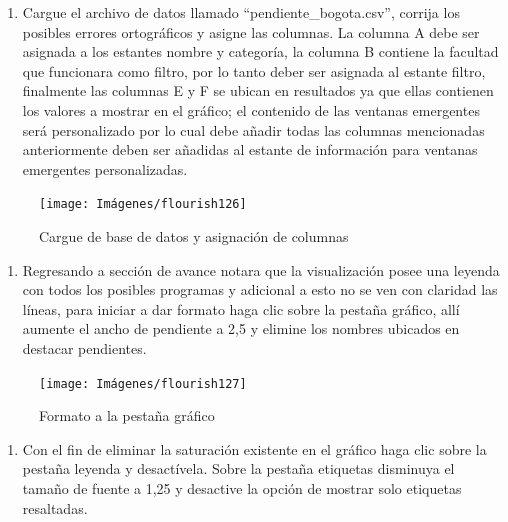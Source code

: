 \documentclass[
]{book}
\providecommand{\tightlist}{%
  \setlength{\itemsep}{0pt}\setlength{\parskip}{0pt}}
\begin{document}
\begin{enumerate}
\def\labelenumi{\arabic{enumi}.}
\tightlist
\item
  Cargue el archivo de datos llamado ``pendiente\_bogota.csv'', corrija los posibles errores ortográficos y asigne las columnas. La columna A debe ser asignada a los estantes nombre y categoría, la columna B contiene la facultad que funcionara como filtro, por lo tanto deber ser asignada al estante filtro, finalmente las columnas E y F se ubican en resultados ya que ellas contienen los valores a mostrar en el gráfico; el contenido de las ventanas emergentes será personalizado por lo cual debe añadir todas las columnas mencionadas anteriormente deben ser añadidas al estante de información para ventanas emergentes personalizadas.
\end{enumerate}

\begin{figure}

{\centering \texttt{[image: Imágenes/flourish126]} 

}

\caption{Cargue de base de datos y asignación de columnas}\label{fig:paso1pendienteflourish-fig}
\end{figure}

\begin{enumerate}
\def\labelenumi{\arabic{enumi}.}
\setcounter{enumi}{1}
\tightlist
\item
  Regresando a sección de avance notara que la visualización posee una leyenda con todos los posibles programas y adicional a esto no se ven con claridad las líneas, para iniciar a dar formato haga clic sobre la pestaña gráfico, allí aumente el ancho de pendiente a 2,5 y elimine los nombres ubicados en destacar pendientes.
\end{enumerate}

\begin{figure}

{\centering \texttt{[image: Imágenes/flourish127]} 

}

\caption{Formato a la pestaña gráfico}\label{fig:paso2pendienteflourish-fig}
\end{figure}

\begin{enumerate}
\def\labelenumi{\arabic{enumi}.}
\setcounter{enumi}{2}
\tightlist
\item
  Con el fin de eliminar la saturación existente en el gráfico haga clic sobre la pestaña leyenda y desactívela. Sobre la pestaña etiquetas disminuya el tamaño de fuente a 1,25 y desactive la opción de mostrar solo etiquetas resaltadas.
\end{enumerate}
\end{document}
